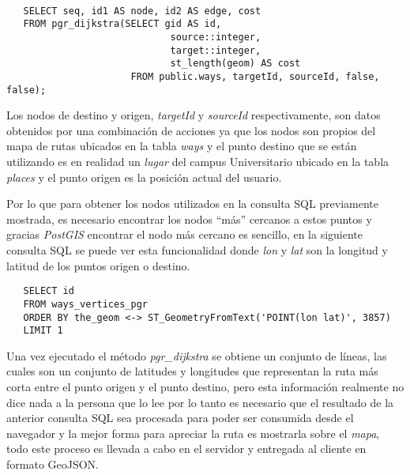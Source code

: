 \begin{center}
 \begin{lstlisting}[label=pgr_dijkstra,caption=Algoritmo de Dijkstra implementado en \emph{pRouting}]

   SELECT seq, id1 AS node, id2 AS edge, cost
   FROM pgr_dijkstra(SELECT gid AS id,
                             source::integer,
                             target::integer,
                             st_length(geom) AS cost
                      FROM public.ways, targetId, sourceId, false, false);

 \end{lstlisting}
\end{center}



Los nodos de destino y origen, \emph{targetId} y \emph{sourceId} respectivamente, son datos obtenidos por una combinación de acciones ya que los nodos son propios del mapa de rutas ubicados en la tabla \emph{ways} y el punto destino que se están utilizando es en realidad un \emph{lugar} del campus Universitario ubicado en la tabla \emph{places} y el punto origen es la posición actual del usuario.

Por lo que para obtener los nodos utilizados en la consulta SQL previamente mostrada, es necesario encontrar los nodos ``más'' cercanos a estos puntos y gracias \emph{PostGIS} encontrar el nodo más cercano es sencillo, en la siguiente consulta SQL se puede ver esta funcionalidad  donde \emph{lon} y \emph{lat} son la longitud y latitud de los puntos origen o destino. \\

\begin{verbatim}
   SELECT id
   FROM ways_vertices_pgr
   ORDER BY the_geom <-> ST_GeometryFromText('POINT(lon lat)', 3857)
   LIMIT 1
\end{verbatim}

Una vez ejecutado el método \emph{pgr\_dijkstra} se obtiene un conjunto de líneas, las cuales son un conjunto de latitudes y longitudes que representan la ruta más corta entre el punto origen y el punto destino, pero esta información realmente no dice nada a la persona que lo lee por lo tanto es necesario que el resultado de la anterior consulta SQL sea procesada para poder ser consumida desde el navegador y la mejor forma para apreciar la ruta es mostrarla sobre el \emph{mapa}, todo este proceso es llevada a cabo en el servidor y entregada al cliente en formato GeoJSON.\\







